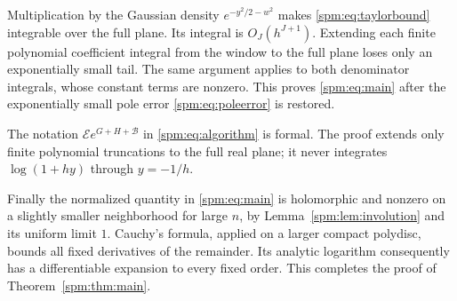 Multiplication by the Gaussian density $e^{-y^2/2-w^2}$ makes \eqref{spm:eq:taylorbound} integrable over the full plane. Its integral is $O_J(h^{J+1})$. Extending each finite polynomial coefficient integral from the window to the full plane loses only an exponentially small tail. The same argument applies to both denominator integrals, whose constant terms are nonzero. This proves \eqref{spm:eq:main} after the exponentially small pole error \eqref{spm:eq:poleerror} is restored.

The notation $\mathcal E e^{G+H+\mathcal B}$ in \eqref{spm:eq:algorithm} is formal. The proof extends only finite polynomial truncations to the full real plane; it never integrates $\log(1+hy)$ through $y=-1/h$.

Finally the normalized quantity in \eqref{spm:eq:main} is holomorphic and nonzero on a slightly smaller neighborhood for large $n$, by Lemma~\ref{spm:lem:involution} and its uniform limit $1$. Cauchy's formula, applied on a larger compact polydisc, bounds all fixed derivatives of the remainder. Its analytic logarithm consequently has a differentiable expansion to every fixed order. This completes the proof of Theorem~\ref{spm:thm:main}.

